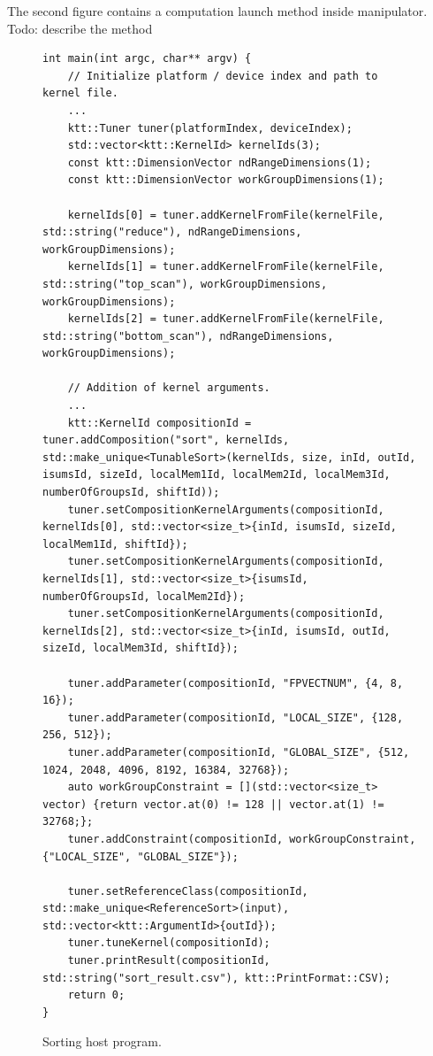 \documentclass
[
    digital, %
    oneside, %
    table, %
    nolof, %
    nolot, %
    nocover %
]{fithesis3}
\begin{document}
The second figure contains a computation launch method inside manipulator. Todo: describe the method

\begin{figure}
\footnotesize
\begin{adjustwidth}{-1cm}{-1cm}
\begin{lstlisting}
int main(int argc, char** argv) {
    // Initialize platform / device index and path to kernel file.
    ...
    ktt::Tuner tuner(platformIndex, deviceIndex);
    std::vector<ktt::KernelId> kernelIds(3);
    const ktt::DimensionVector ndRangeDimensions(1);
    const ktt::DimensionVector workGroupDimensions(1);
    
    kernelIds[0] = tuner.addKernelFromFile(kernelFile, std::string("reduce"), ndRangeDimensions, workGroupDimensions);
    kernelIds[1] = tuner.addKernelFromFile(kernelFile, std::string("top_scan"), workGroupDimensions, workGroupDimensions);
    kernelIds[2] = tuner.addKernelFromFile(kernelFile, std::string("bottom_scan"), ndRangeDimensions, workGroupDimensions);
    
    // Addition of kernel arguments.
    ...
    ktt::KernelId compositionId = tuner.addComposition("sort", kernelIds, std::make_unique<TunableSort>(kernelIds, size, inId, outId, isumsId, sizeId, localMem1Id, localMem2Id, localMem3Id, numberOfGroupsId, shiftId));
    tuner.setCompositionKernelArguments(compositionId, kernelIds[0], std::vector<size_t>{inId, isumsId, sizeId, localMem1Id, shiftId});
    tuner.setCompositionKernelArguments(compositionId, kernelIds[1], std::vector<size_t>{isumsId, numberOfGroupsId, localMem2Id});
    tuner.setCompositionKernelArguments(compositionId, kernelIds[2], std::vector<size_t>{inId, isumsId, outId, sizeId, localMem3Id, shiftId});
    
    tuner.addParameter(compositionId, "FPVECTNUM", {4, 8, 16});
    tuner.addParameter(compositionId, "LOCAL_SIZE", {128, 256, 512});
    tuner.addParameter(compositionId, "GLOBAL_SIZE", {512, 1024, 2048, 4096, 8192, 16384, 32768});
    auto workGroupConstraint = [](std::vector<size_t> vector) {return vector.at(0) != 128 || vector.at(1) != 32768;};
    tuner.addConstraint(compositionId, workGroupConstraint, {"LOCAL_SIZE", "GLOBAL_SIZE"});
    
    tuner.setReferenceClass(compositionId, std::make_unique<ReferenceSort>(input), std::vector<ktt::ArgumentId>{outId});
    tuner.tuneKernel(compositionId);
    tuner.printResult(compositionId, std::string("sort_result.csv"), ktt::PrintFormat::CSV);
    return 0;
}
\end{lstlisting}
\caption{Sorting host program.}
\label{sort-example-main}
\end{adjustwidth}
\end{figure}
\end{document}
